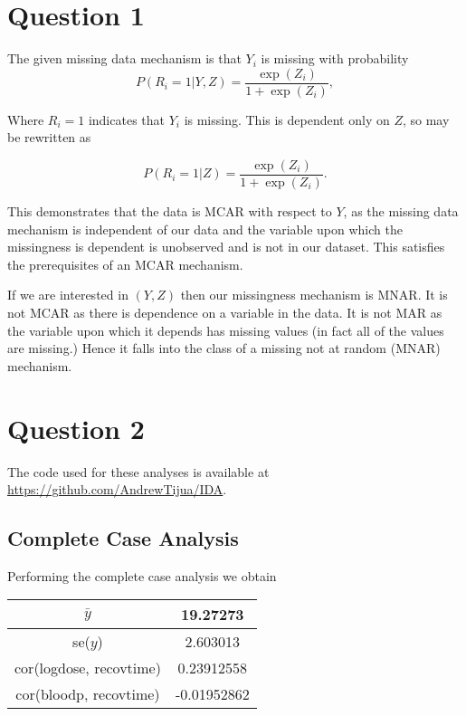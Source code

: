 \documentclass[11pt]{article}
\begin{document}
	
\section{Question 1}

The given missing data mechanism is that $Y_i$ is missing with probability $$P(R_i = 1|Y,Z) = \frac{\exp(Z_i)}{1+\exp(Z_i)},$$

Where $R_i = 1$ indicates that $Y_i$ is missing. This is dependent only on $Z$, so may be rewritten as 

$$P(R_i = 1|Z) = \frac{\exp(Z_i)}{1+\exp(Z_i)}.$$

This demonstrates that the data is MCAR with respect to $Y$, as the missing data mechanism is independent of our data and the variable upon which the missingness is dependent is unobserved and is not in our dataset. This satisfies the prerequisites of an MCAR mechanism.

If we are interested in $(Y,Z)$ then our missingness mechanism is MNAR. It is not MCAR as there is dependence on a variable in the data. It is not MAR as the variable upon which it depends has missing values (in fact all of the values are missing.) Hence it falls into the class of a missing not at random (MNAR) mechanism.

\section{Question 2}

The code used for these analyses is available at \url{https://github.com/AndrewTijua/IDA}.

\subsection*{Complete Case Analysis}

Performing the complete case analysis we obtain 

\begin{table}[H]
\centering
\begin{tabular}{|c|c|}
	\hline 
	$\bar{y}$ & 19.27273\\ 
	\hline 
	se($y$) & 2.603013\\ 
	\hline 
	cor(logdose, recovtime) & 0.23912558\\ 
	\hline 
	cor(bloodp, recovtime) & -0.01952862\\ 
	\hline 
\end{tabular} 
\end{table}
\end{document}
